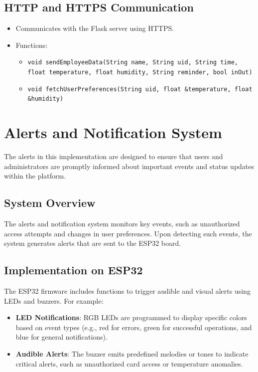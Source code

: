 \documentclass[a4paper,12pt]{report}
\begin{document}
\subsection{HTTP and HTTPS Communication}
\begin{itemize}
    \item Communicates with the Flask server using HTTPS.
    \item Functions:
    \begin{itemize}
        \item \texttt{void sendEmployeeData(String name, String uid, String time, float temperature, float humidity, String reminder, bool inOut)}
        \item \texttt{void fetchUserPreferences(String uid, float \&temperature, float \&humidity)}
    \end{itemize}
\end{itemize}

\section{Alerts and Notification System}

The alerts in this implementation are designed to ensure that users and administrators
are promptly informed about important events and status updates within the platform. 

\subsection{System Overview}
The alerts and notification system monitors key events, such as unauthorized access attempts and changes in user preferences.
Upon detecting such events, the system generates alerts that are sent to the ESP32 board.

\subsection{Implementation on ESP32}
The ESP32 firmware includes functions to trigger audible and visual alerts using LEDs and buzzers. For example:
\begin{itemize}
    \item \textbf{LED Notifications}: RGB LEDs are programmed to display specific colors based on event types (e.g., red for errors, green for successful operations, and blue for general notifications).
    \item \textbf{Audible Alerts}: The buzzer emits predefined melodies or tones to indicate critical alerts, such as unauthorized card access or temperature anomalies.
\end{itemize}
\end{document}
